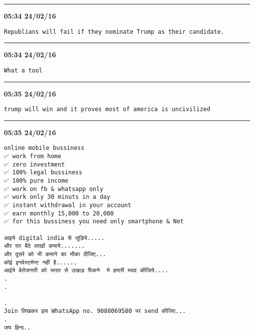 \hrule%

\begin{adjustwidth}{0cm}{0cm}
\footnotesize \textbf{05:34 24/02/16}

\begin{lstlisting}[breaklines, breakatwhitespace, basicstyle=\small, frame=leftline]
Republians will fail if they nominate Trump as their candidate.
\end{lstlisting}
\end{adjustwidth}

\hrule%

\begin{adjustwidth}{0cm}{0cm}
\footnotesize \textbf{05:34 24/02/16}

\begin{lstlisting}[breaklines, breakatwhitespace, basicstyle=\small, frame=leftline]
What a tool
\end{lstlisting}
\end{adjustwidth}

\hrule%

\begin{adjustwidth}{0cm}{0cm}
\footnotesize \textbf{05:35 24/02/16}

\begin{lstlisting}[breaklines, breakatwhitespace, basicstyle=\small, frame=leftline]
trump will win and it proves most of america is uncivilized
\end{lstlisting}
\end{adjustwidth}

\hrule%

\begin{adjustwidth}{0cm}{0cm}
\footnotesize \textbf{05:35 24/02/16}

\begin{lstlisting}[breaklines, breakatwhitespace, basicstyle=\small, frame=leftline]
online mobile bussiness 
✅ work from home
✅ zero investment
✅ 100% legal bussiness
✅ 100% pure income
✅ work on fb & whatsapp only
✅ work only 30 minuts in a day
✅ instant withdrawal in your account
✅ earn monthly 15,000 to 20,000
✅ for this bussiness you need only smartphone & Net

आइये digital india से जुड़िये.....
और घर बैठे लाखों कमाये.......
और दूसरे को भी कमाने का मौका दीजिए...
कोई इनवेस्टमेन्ट नहीं है......
आईये बेरोजगारी को भारत से उखाड़ फैंकने  मे हमारी मदद कीजिये....
.
.

.
Join लिखकर इस WhatsApp no. 9088069580 पर send कीजिए...
.
जय हिन्द..
\end{lstlisting}
\end{adjustwidth}

